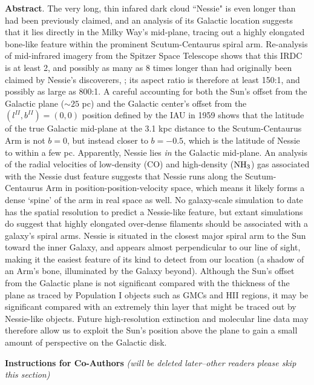 \documentclass[]{article}
\begin{document}
\textbf{Abstract}. The very long, thin infared dark cloud ``Nessie" is
even longer than had been previously claimed, and an analysis of its
Galactic location suggests that it lies directly in the Milky Way's
mid-plane, tracing out a highly elongated bone-like feature within the
prominent Scutum-Centaurus spiral arm. Re-analysis of mid-infrared
imagery from the Spitzer Space Telescope shows that this IRDC is at
least 2, and possibly as many as 8 times longer than had originally been
claimed by Nessie's discoverers, \citet{Jackson2010}; its aspect ratio
is therefore at least 150:1, and possibly as large as 800:1. A careful
accounting for both the Sun's offset from the Galactic plane ($\sim 25$
pc) and the Galactic center's offset from the $(l^{II},b^{II})=(0,0)$
position defined by the IAU in 1959 shows that the latitude of the true
Galactic mid-plane at the 3.1 kpc distance to the Scutum-Centaurus Arm
is not $b=0$, but instead closer to $b=-0.5$, which is the latitude of
Nessie to within a few pc. Apparently, Nessie lies \emph{in} the
Galactic mid-plane. An analysis of the radial velocities of low-density
(CO) and high-density (${\rm NH}_3$) gas associated with the Nessie dust
feature suggests that Nessie runs along the Scutum-Centaurus Arm in
position-position-velocity space, which means it likely forms a dense
`spine' of the arm in real space as well. No galaxy-scale simulation to
date has the spatial resolution to predict a Nessie-like feature, but
extant simulations do suggest that highly elongated over-dense filaments
should be associated with a galaxy's spiral arms. Nessie is situated in
the closest major spiral arm to the Sun toward the inner Galaxy, and
appears almost perpendicular to our line of sight, making it the easiest
feature of its kind to detect from our location (a shadow of an Arm's
bone, illuminated by the Galaxy beyond). Although the Sun's offset from
the Galactic plane is not significant compared with the thickness of the
plane as traced by Population I objects such as GMCs and HII regions, it
may be significant compared with an extremely thin layer that might be
traced out by Nessie-like objects. Future high-resolution extinction and
molecular line data may therefore allow us to exploit the Sun's position
above the plane to gain a small amount of perspective on the Galactic
disk.

\textbf{Instructions for Co-Authors} \emph{(will be deleted later--other
readers please skip this section)}
\end{document}
